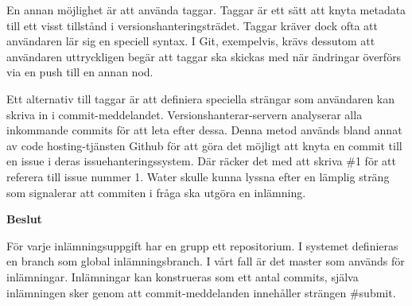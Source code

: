 En annan möjlighet är att använda taggar. Taggar är ett sätt att knyta metadata till ett visst tillstånd i versionshanteringsträdet. Taggar kräver dock ofta att användaren lär sig en speciell syntax. I Git, exempelvis, krävs dessutom att användaren uttryckligen begär att taggar ska skickas med när ändringar överförs via en push till en annan nod.

Ett alternativ till taggar är att definiera speciella strängar som användaren kan skriva in i commit-meddelandet. Versionshanterar-servern analyserar alla inkommande commits för att leta efter dessa. Denna metod används bland annat av code hosting-tjänsten Github för att göra det möjligt att knyta en commit till en issue i deras issuehanteringssystem. Där räcker det med att skriva \#1 för att referera till issue nummer 1. Water skulle kunna lyssna efter en lämplig sträng som signalerar att commiten i fråga ska utgöra en inlämning.

\begin{flushright}
  
  \textbf{Beslut}
  
  För varje inlämningsuppgift har en grupp ett repositorium. I systemet definieras en branch som global inlämningsbranch. I vårt fall är det master som används för inlämningar. Inlämningar kan konstrueras som ett antal commits, själva inlämningen sker genom att commit-meddelanden innehåller strängen \#submit.
\end{flushright}
